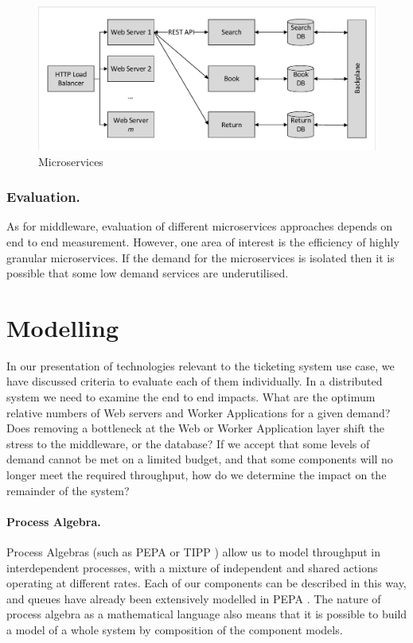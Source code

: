 \documentclass{llncs}
\begin{document}
\begin{figure}
\caption{Microservices}
\centering
\includegraphics[trim = 5 5 5 5, clip, width=\textwidth]{microservices}
\end{figure}

\subsubsection{Evaluation.}
As for middleware, evaluation of different microservices approaches depends on end to end measurement.   However, one area of interest is the efficiency of highly granular microservices.  If the demand for the microservices is isolated then it is possible that some low demand services are underutilised.

\section{Modelling}

In our presentation of technologies relevant to the ticketing system use case, we have discussed criteria to evaluate each of them individually.  In a distributed system we need to examine the end to end impacts.  What are the optimum relative numbers of Web servers and Worker Applications for a given demand? Does removing a bottleneck at the Web or Worker Application layer shift the stress to the middleware, or the database?  If we accept that some levels of demand cannot be met on a limited budget, and that some components will no longer meet the required throughput, how do we determine the impact on the remainder of the system?

\paragraph{Process Algebra.} Process Algebras (such as PEPA or TIPP \cite{gotz1993multiprocessor}) allow us to model throughput in interdependent processes, with a mixture of independent and shared actions operating at different rates.  Each of our components can be described in this way, and queues have already been extensively modelled in PEPA \cite{thomas1997using}.  The nature of process algebra as a mathematical language also means that it is possible to build a model of a whole system by composition of the component models.
\end{document}
